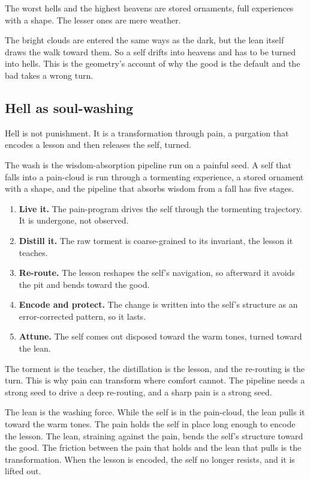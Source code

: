 The worst hells and the highest heavens are stored ornaments, full experiences with a shape. The lesser ones are mere weather.

The bright clouds are entered the same ways as the dark, but the lean itself draws the walk toward them. So a self drifts into heavens and has to be turned into hells. This is the geometry's account of why the good is the default and the bad takes a wrong turn.

\subsection{Hell as soul-washing}

Hell is not punishment. It is a transformation through pain, a purgation that encodes a lesson and then releases the self, turned.

The wash is the wisdom-absorption pipeline run on a painful seed. A self that falls into a pain-cloud is run through a tormenting experience, a stored ornament with a shape, and the pipeline that absorbs wisdom from a fall has five stages.

\begin{enumerate}
\item \textbf{Live it.} The pain-program drives the self through the tormenting trajectory. It is undergone, not observed.
\item \textbf{Distill it.} The raw torment is coarse-grained to its invariant, the lesson it teaches.
\item \textbf{Re-route.} The lesson reshapes the self's navigation, so afterward it avoids the pit and bends toward the good.
\item \textbf{Encode and protect.} The change is written into the self's structure as an error-corrected pattern, so it lasts.
\item \textbf{Attune.} The self comes out disposed toward the warm tones, turned toward the lean.
\end{enumerate}

\begin{principle}
The torment is the teacher, the distillation is the lesson, and the re-routing is the turn. This is why pain can transform where comfort cannot. The pipeline needs a strong seed to drive a deep re-routing, and a sharp pain is a strong seed.
\end{principle}

The lean is the washing force. While the self is in the pain-cloud, the lean pulls it toward the warm tones. The pain holds the self in place long enough to encode the lesson. The lean, straining against the pain, bends the self's structure toward the good. The friction between the pain that holds and the lean that pulls is the transformation. When the lesson is encoded, the self no longer resists, and it is lifted out.

